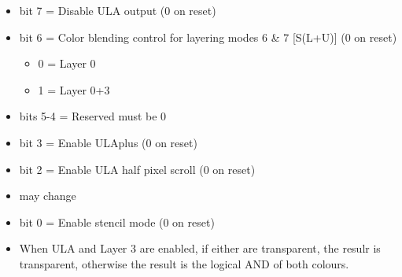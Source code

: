 \begin{itemize}
\item bit 7 = Disable ULA output (0 on reset)
\item bit 6 = Color blending control for layering modes 6 \& 7
  [S(L+U)] (0 on reset)
  \begin{itemize}
  \item 0 = Layer 0
  \item 1 = Layer 0+3
  \end{itemize}
\item bits 5-4 = Reserved must be 0
\item bit 3 = Enable ULAplus (0 on reset)
\item bit 2 = Enable ULA half pixel scroll (0 on reset)
\item[] may change
\item bit 0 = Enable stencil mode (0 on reset)
\item[] When ULA and Layer 3 are enabled, if either are transparent,
  the resulr is transparent, otherwise the result is the logical AND
  of both colours.
\end{itemize}

